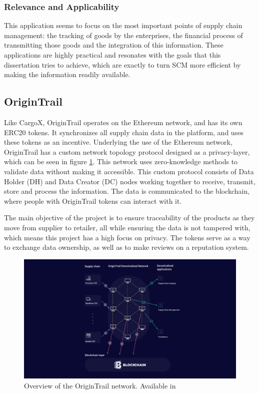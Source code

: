 \subsubsection{Relevance and Applicability}
This application seems to focus on the most important points of supply chain management: the tracking of goods by the enterprises, the financial process of transmitting those goods and the integration of this information. These applications are highly practical and resonates with the goals that this dissertation tries to achieve, which are exactly to turn SCM more efficient by making the information readily available.

\subsection{OriginTrail}
Like CargoX, OriginTrail operates on the Ethereum network, and has its own ERC20 tokens. It synchronizes all supply chain data in the platform, and uses these tokens as an incentive. Underlying the use of the Ethereum network, OriginTrail has a custom network topology protocol designed as a privacy-layer, which can be seen in figure \ref{fig:origintrail_network}. This network uses zero-knowledge methods to validate data without making it accessible. This custom protocol consists of Data Holder (DH) and Data Creator (DC) nodes working together to receive, transmit, store and process the information. The data is communicated to the blockchain, where people with OriginTrail tokens can interact with it.

The main objective of the project is to ensure traceability of the products as they move from supplier to retailer, all while ensuring the data is not tampered with, which means this project has a high focus on privacy. The tokens serve as a way to exchange data ownership, as well as to make reviews on a reputation system. \cite{Rakic2017}

\begin{figure}[h]
\centering
\includegraphics[scale=0.5]{media/origin_trail_network.jpg}
\caption[Overview of the OriginTrail network]{Overview of the OriginTrail network. Available in \cite{OriginTrailTechno}}
\label{fig:origintrail_network}
\end{figure}

